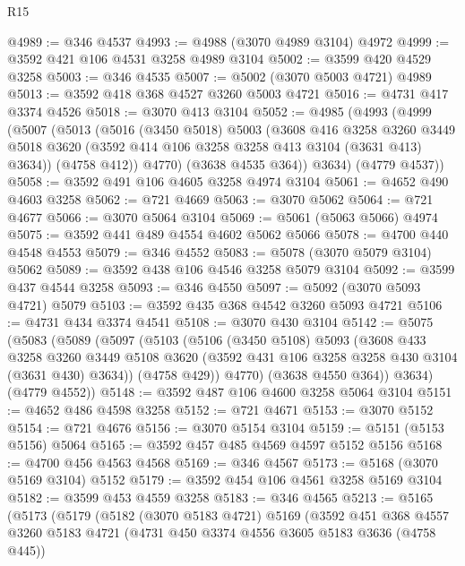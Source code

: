 \begin{lexlean}{R15}
\begin{coremodule}
@4989 := @346 @4537
@4993 := @4988 (@3070 @4989 @3104) @4972
@4999 := @3592 @421 @106 @4531 @3258 @4989 @3104
@5002 := @3599 @420 @4529 @3258
@5003 := @346 @4535
@5007 := @5002 (@3070 @5003 @4721) @4989
@5013 := @3592 @418 @368 @4527 @3260 @5003 @4721
@5016 := @4731 @417 @3374 @4526
@5018 := @3070 @413 @3104
@5052 := @4985
    (@4993
      (@4999
        (@5007
          (@5013
            (@5016
              (@3450 @5018)
              @5003
              (@3608
                @416
                @3258
                @3260
                @3449
                @5018
                @3620
                (@3592 @414 @106 @3258 @3258 @413 @3104 (@3631 @413) @3634))
              (@4758 @412))
            @4770)
          (@3638 @4535 @364))
        @3634)
      (@4779 @4537))
@5058 := @3592 @491 @106 @4605 @3258 @4974 @3104
@5061 := @4652 @490 @4603 @3258
@5062 := @721 @4669
@5063 := @3070 @5062
@5064 := @721 @4677
@5066 := @3070 @5064 @3104
@5069 := @5061 (@5063 @5066) @4974
@5075 := @3592 @441 @489 @4554 @4602 @5062 @5066
@5078 := @4700 @440 @4548 @4553
@5079 := @346 @4552
@5083 := @5078 (@3070 @5079 @3104) @5062
@5089 := @3592 @438 @106 @4546 @3258 @5079 @3104
@5092 := @3599 @437 @4544 @3258
@5093 := @346 @4550
@5097 := @5092 (@3070 @5093 @4721) @5079
@5103 := @3592 @435 @368 @4542 @3260 @5093 @4721
@5106 := @4731 @434 @3374 @4541
@5108 := @3070 @430 @3104
@5142 := @5075
    (@5083
      (@5089
        (@5097
          (@5103
            (@5106
              (@3450 @5108)
              @5093
              (@3608
                @433
                @3258
                @3260
                @3449
                @5108
                @3620
                (@3592 @431 @106 @3258 @3258 @430 @3104 (@3631 @430) @3634))
              (@4758 @429))
            @4770)
          (@3638 @4550 @364))
        @3634)
      (@4779 @4552))
@5148 := @3592 @487 @106 @4600 @3258 @5064 @3104
@5151 := @4652 @486 @4598 @3258
@5152 := @721 @4671
@5153 := @3070 @5152
@5154 := @721 @4676
@5156 := @3070 @5154 @3104
@5159 := @5151 (@5153 @5156) @5064
@5165 := @3592 @457 @485 @4569 @4597 @5152 @5156
@5168 := @4700 @456 @4563 @4568
@5169 := @346 @4567
@5173 := @5168 (@3070 @5169 @3104) @5152
@5179 := @3592 @454 @106 @4561 @3258 @5169 @3104
@5182 := @3599 @453 @4559 @3258
@5183 := @346 @4565
@5213 := @5165
    (@5173
      (@5179
        (@5182
          (@3070 @5183 @4721)
          @5169
          (@3592
            @451
            @368
            @4557
            @3260
            @5183
            @4721
            (@4731 @450 @3374 @4556 @3605 @5183 @3636 (@4758 @445))

\end{coremodule}
\end{lexlean}
